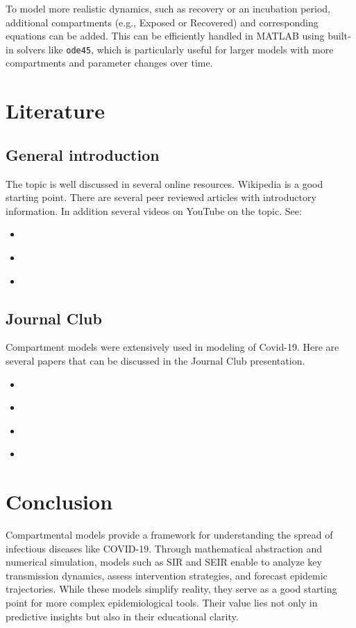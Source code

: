 \documentclass{article}
\begin{document}
To model more realistic dynamics, such as recovery or an incubation period, additional compartments (e.g., Exposed or Recovered) and corresponding equations can be added. This can be efficiently handled in MATLAB using built-in solvers like \texttt{ode45}, which is particularly useful for larger models with more compartments and parameter changes over time.

\section{Literature}
\subsection{General introduction}
The topic is well discussed in several online resources. Wikipedia is a good starting point. There are several peer reviewed articles with introductory information. In addition several videos on YouTube on the topic. See:
\begin{itemize}
    \item \textcite{SIR_wiki}
     \item \textcite{SIR_AbouIsmail2020}
    \item \textcite{SIR_Tolles2020}
\end{itemize}

\subsection{Journal Club}
Compartment models were extensively used in modeling of Covid-19. Here are several papers that can be discussed in the Journal Club presentation.
\begin{itemize}
    \item \textcite{SIR_Bjrnstad2020}
   \item \textcite{SIR_Angulo2021}
    \item \textcite{SIR_Cooper2020}
    \item \textcite{SIR_He2020}

\end{itemize}


\section{Conclusion}
Compartmental models provide a framework for understanding the spread of infectious diseases like COVID-19. Through mathematical abstraction and numerical simulation, models such as SIR and SEIR enable to analyze key transmission dynamics, assess intervention strategies, and forecast epidemic trajectories. While these models simplify reality, they serve as a good starting point for more complex epidemiological tools. Their value lies not only in predictive insights but also in their educational clarity. 


\printbibliography
\end{document}

